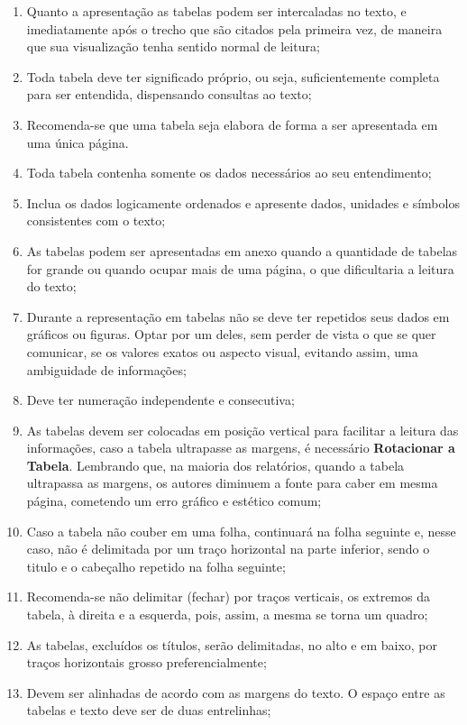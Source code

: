\begin{enumerate}
\item Quanto a apresentação as tabelas podem ser intercaladas no texto, e imediatamente após o trecho que são citados pela primeira vez, de maneira que sua visualização tenha sentido normal de leitura;  
\item Toda tabela deve ter significado próprio, ou seja, suficientemente completa para ser entendida, dispensando consultas ao texto; 
\item Recomenda-se que uma tabela seja elabora
de forma a ser apresentada em uma única página.
\item Toda tabela contenha somente os dados necessários ao seu entendimento;
\item Inclua os dados logicamente ordenados e apresente dados, unidades e símbolos consistentes com o texto;
\item As tabelas podem ser apresentadas em anexo quando a quantidade de tabelas for grande ou quando ocupar mais de uma página, o que dificultaria a leitura do texto; 
\item Durante a representação em tabelas não se deve ter repetidos seus dados em gráficos ou figuras. Optar por um deles, sem perder de vista o que se quer comunicar, se os valores exatos ou aspecto visual, evitando assim, uma ambiguidade de informações;
\item Deve ter numeração independente e consecutiva; 
\item As tabelas devem ser colocadas em posição vertical para facilitar a leitura das informações, caso a tabela ultrapasse as margens, é necessário \textbf{Rotacionar a Tabela}. Lembrando que, na maioria dos relatórios, quando a tabela ultrapassa as margens, os autores diminuem a fonte para caber em mesma página, cometendo um erro gráfico e estético comum; 
\item Caso a tabela não couber em uma folha,
continuará na folha seguinte e, nesse caso, não é delimitada por
um traço horizontal na parte inferior, sendo o titulo e o
cabeçalho repetido na folha seguinte; 
\item Recomenda-se não
delimitar (fechar) por traços verticais, os extremos da tabela, à
direita e a esquerda, pois, assim, a mesma se torna um quadro;
\item As tabelas, excluídos os títulos, serão delimitadas, no alto e em baixo, por traços horizontais grosso preferencialmente;
\item Devem ser alinhadas de acordo com as margens do texto. O espaço entre as tabelas e texto deve ser de duas entrelinhas;

\end{enumerate}
